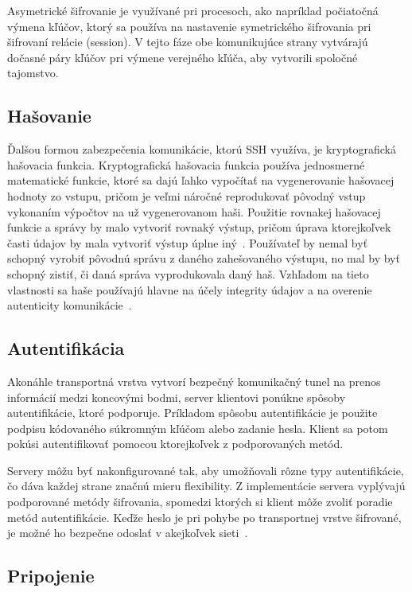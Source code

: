Asymetrické šifrovanie je využívané pri procesoch, ako napríklad počiatočná výmena kľúčov, ktorý sa používa na nastavenie
symetrického šifrovania pri šifrovaní relácie (session).
V tejto fáze obe komunikujúce strany vytvárajú dočasné páry kľúčov pri výmene verejného kľúča, aby vytvorili spoločné tajomstvo.

\subsection{Hašovanie}\label{subsec:hasovanie}

Ďalšou formou zabezpečenia komunikácie, ktorú SSH využíva, je kryptografická hašovacia funkcia.
Kryptografická hašovacia funkcia používa jednosmerné matematické funkcie, ktoré sa dajú ľahko vypočítať na vygenerovanie
hašovacej hodnoty zo vstupu, pričom je veľmi náročné reprodukovať pôvodný vstup vykonaním výpočtov na už vygenerovanom haši.
Použitie rovnakej hašovacej funkcie a správy by malo vytvoriť rovnaký výstup, pričom úprava ktorejkoľvek časti údajov by
mala vytvoriť výstup úplne iný~\cite{EDGAR201733}.
Používateľ by nemal byť schopný vyrobiť pôvodnú správu z daného zahešovaného výstupu, no mal by byť schopný zistiť, či daná správa
vyprodukovala daný haš.
Vzhľadom na tieto vlastnosti sa haše používajú hlavne na účely integrity údajov a na overenie autenticity komunikácie~\cite{SshEncryption}.

\subsection{Autentifikácia}\label{subsec:autentifikacia}

Akonáhle transportná vrstva vytvorí bezpečný komunikačný tunel na prenos informácií medzi koncovými bodmi, server klientovi
ponúkne spôsoby autentifikácie, ktoré podporuje.
Príkladom spôsobu autentifikácie je použite podpisu kódovaného súkromným kľúčom alebo zadanie hesla.
Klient sa potom pokúsi autentifikovať pomocou ktorejkoľvek z podporovaných metód.

Servery môžu byť nakonfigurované tak, aby umožňovali rôzne typy autentifikácie, čo dáva každej strane značnú mieru flexibility.
Z implementácie servera vyplývajú podporované metódy šifrovania, spomedzi ktorých si klient môže zvoliť poradie metód autentifikácie.
Keďže heslo je pri pohybe po transportnej vrstve šifrované, je možné ho bezpečne odoslať v akejkoľvek sieti~\cite{SshSecurity}.

\subsection{Pripojenie}\label{subsec:pripojenie}

